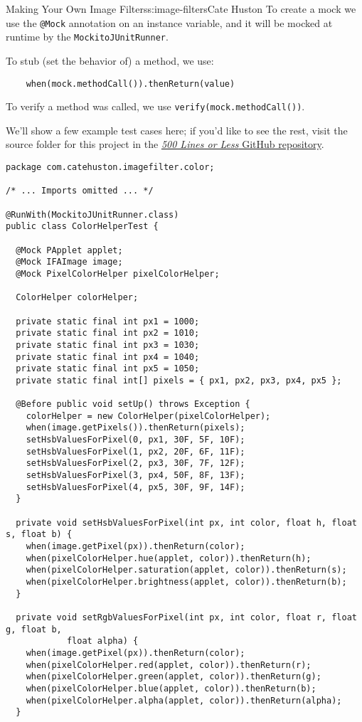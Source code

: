 \begin{aosachapter}{Making Your Own Image Filters}{s:image-filters}{Cate Huston}
To create a mock we use the \texttt{@Mock} annotation on an instance
variable, and it will be mocked at runtime by the
\texttt{MockitoJUnitRunner}.

To stub (set the behavior of) a method, we use:

\begin{verbatim}
    when(mock.methodCall()).thenReturn(value)
\end{verbatim}

To verify a method was called, we use
\texttt{verify(mock.methodCall())}.

We'll show a few example test cases here; if you'd like to see the rest,
visit the source folder for this project in the
\href{https://github.com/aosabook/500lines/tree/master/image-filters}{\emph{500
Lines or Less} GitHub repository}.

\begin{verbatim}
package com.catehuston.imagefilter.color;

/* ... Imports omitted ... */

@RunWith(MockitoJUnitRunner.class)
public class ColorHelperTest {

  @Mock PApplet applet;
  @Mock IFAImage image;
  @Mock PixelColorHelper pixelColorHelper;

  ColorHelper colorHelper;

  private static final int px1 = 1000;
  private static final int px2 = 1010;
  private static final int px3 = 1030;
  private static final int px4 = 1040;
  private static final int px5 = 1050;
  private static final int[] pixels = { px1, px2, px3, px4, px5 };

  @Before public void setUp() throws Exception {
    colorHelper = new ColorHelper(pixelColorHelper);
    when(image.getPixels()).thenReturn(pixels);
    setHsbValuesForPixel(0, px1, 30F, 5F, 10F);
    setHsbValuesForPixel(1, px2, 20F, 6F, 11F);
    setHsbValuesForPixel(2, px3, 30F, 7F, 12F);
    setHsbValuesForPixel(3, px4, 50F, 8F, 13F);
    setHsbValuesForPixel(4, px5, 30F, 9F, 14F);
  }

  private void setHsbValuesForPixel(int px, int color, float h, float s, float b) {
    when(image.getPixel(px)).thenReturn(color);
    when(pixelColorHelper.hue(applet, color)).thenReturn(h);
    when(pixelColorHelper.saturation(applet, color)).thenReturn(s);
    when(pixelColorHelper.brightness(applet, color)).thenReturn(b);
  }

  private void setRgbValuesForPixel(int px, int color, float r, float g, float b, 
            float alpha) {
    when(image.getPixel(px)).thenReturn(color);
    when(pixelColorHelper.red(applet, color)).thenReturn(r);
    when(pixelColorHelper.green(applet, color)).thenReturn(g);
    when(pixelColorHelper.blue(applet, color)).thenReturn(b);
    when(pixelColorHelper.alpha(applet, color)).thenReturn(alpha);
  }


\end{verbatim}
\end{aosachapter}
